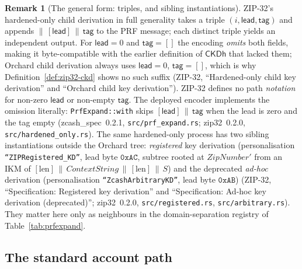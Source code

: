 \documentclass[11pt,a4paper]{article}
\theoremstyle{definition}
\newtheorem{remark}[theorem]{Remark}
\begin{document}
\begin{remark}[The general form: triples, and sibling instantiations]
ZIP-32's hardened-only child derivation in full generality takes a triple
$(i, \mathsf{lead}, \mathsf{tag})$ and appends
$\|\, [\mathsf{lead}] \,\|\, \mathsf{tag}$ to the PRF message; each distinct
triple yields an independent output. For $\mathsf{lead} = 0$ and
$\mathsf{tag} = []$ the encoding \emph{omits} both fields, making it
byte-compatible with the earlier definition of $\mathsf{CKDh}$ that lacked
them; Orchard child derivation always uses $\mathsf{lead} = 0$,
$\mathsf{tag} = []$, which is why Definition~\ref{def:zip32-ckd} shows no
such suffix (ZIP-32, ``Hardened-only child key derivation'' and ``Orchard
child key derivation''). ZIP-32 defines no path \emph{notation} for
non-zero $\mathsf{lead}$ or non-empty $\mathsf{tag}$. The deployed encoder
implements the omission literally: \texttt{PrfExpand::with} skips
$[\mathsf{lead}] \,\|\, \mathsf{tag}$ when the lead is zero and the tag
empty (\textsf{zcash\_spec}~0.2.1, \texttt{src/prf\_expand.rs};
\textsf{zip32}~0.2.0, \texttt{src/hardened\_only.rs}). The same
hardened-only process has two sibling instantiations outside the Orchard
tree: \emph{registered} key derivation (personalisation
\texttt{``ZIPRegistered\_KD''}, lead byte $\mathtt{0xAC}$, subtree rooted at
$\mathit{ZipNumber}'$ from an IKM of
$[\mathrm{len}] \,\|\, \mathit{ContextString} \,\|\, [\mathrm{len}] \,\|\, S$)
and the deprecated \emph{ad-hoc} derivation (personalisation
\texttt{``ZcashArbitraryKD''}, lead byte $\mathtt{0xAB}$) (ZIP-32,
``Specification: Registered key derivation'' and ``Specification: Ad-hoc
key derivation (deprecated)''; \textsf{zip32}~0.2.0,
\texttt{src/registered.rs}, \texttt{src/arbitrary.rs}). They matter here
only as neighbours in the domain-separation registry of
Table~\ref{tab:prfexpand}.
\end{remark}

\subsection{The standard account path}\label{sec:zip32-path}
\end{document}
